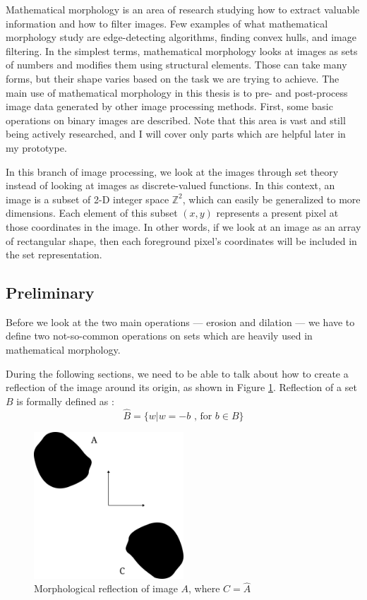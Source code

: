 \documentclass[
  digital,     %
  oneside,     %
  nosansbold,  %
  nocolorbold, %
  lof,         %
  lot,         %
]{fithesis4}
\newcommand*{\Z}{\ensuremath{\mathbb{Z}}}
\begin{document}
Mathematical morphology is an area of research studying how to extract valuable
information and how to filter images. Few examples of what mathematical
morphology study are edge-detecting algorithms, finding convex hulls, and image
filtering. In the simplest terms, mathematical morphology looks at images as
sets of numbers and modifies them using structural elements. Those can take many
forms, but their shape varies based on the task we are trying to achieve. The
main use of mathematical morphology in this thesis is to pre- and post-process
image data generated by other image processing methods. First, some basic
operations on binary images are described. Note that this area is vast and still
being actively researched, and I will cover only parts which are helpful later
in my prototype.

In this branch of image processing, we look at the images through set theory
instead of looking at images as discrete-valued functions. In this context, an
image is a subset of 2-D integer space $\Z^2$, which can easily be generalized
to more dimensions. Each element of this subset $(x, y)$ represents a present
pixel at those coordinates in the image. In other words, if we look at an image
as an array of rectangular shape, then each foreground pixel's coordinates will
be included in the set representation.

\subsection{Preliminary}
Before we look at the two main operations --- erosion and dilation --- we have to
define two not-so-common operations on sets which are heavily used in
mathematical morphology.

During the following sections, we need to be able to talk about how to create a
reflection of the image around its origin, as shown in Figure
\ref{fig:morp_refl}. Reflection  of a set $B$ is formally defined as \cite{gonzalez2002}:
$$\hat{B} = \{w | w=-b \text{ , for } b \in B\}$$
\begin{figure}
    \begin{center}
        \includegraphics[width=0.5\textwidth]{resources/inkscape/morphology-reflection.png}
    \end{center}
    \caption{Morphological reflection of image $A$, where $C=\hat{A}$} %
    \label{fig:morp_refl}
\end{figure}
\end{document}
